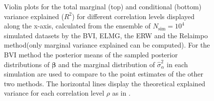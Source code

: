 \begin{figure}[H]
  \centering
  \hfill
  \caption[Marginal and conditional $R^2$ in Gaussian LMM]{Violin plots for the total marginal (top) and conditional (bottom) variance explained ($R^2$) for different correlation levels displayed along the x-axis, calculated from the ensemble of $N_{\text{sim}}=10^4$ simulated datasets by the BVI, ELMG, the ERW and the Relaimpo method(only marginal variance explained can be computed). For the BVI method the posterior means of the sampled posterior distributions of $\boldsymbol{\beta}$ and the marginal distribution of $\hat{\sigma}^2_{\alpha}$ in each simulation are used to compare to the point estimates of the other two methods. The horizontal lines display the theoretical explained variance for each correlation level $\rho$ as in .}
  \label{fig:total_variance}
\end{figure}

